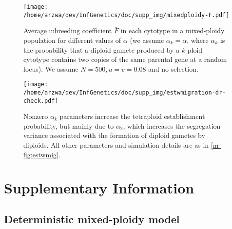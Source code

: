 \documentclass[11pt,a4paper]{article}
\begin{document}
\begin{figure}[H]
\centering
\texttt{[image: /home/arzwa/dev/InfGenetics/doc/supp\_img/mixedploidy-F.pdf]}
\caption{Average inbreeding coefficient \(\bar{F}\) in each cytotype in
a mixed-ploidy population for different values of \(\alpha\) (we assume
\(\alpha_k=\alpha\), where \(\alpha_k\) is the probability that a
diploid gamete produced by a \(k\)-ploid cytotype contains two copies of
the same parental gene at a random locus). We assume \(N=500, u=v=0.08\)
and no selection.}\label{fig:f1}
\end{figure}

\begin{figure}
\texttt{[image: /home/arzwa/dev/InfGenetics/doc/supp\_img/estwmigration-dr-check.pdf]}
\caption{
    Nonzero $\alpha_k$ parameters increase the tetraploid establishment
    probability, but mainly due to $\alpha_2$, which increases the segregation
    variance associated with the formation of diploid gametes by diploids.
    All other parameters and simulation details are as in \cref{m-fig:estwmig}.
\label{fig:suppdr}}
\end{figure}

\clearpage

\section{Supplementary Information}

\subsection{Deterministic mixed-ploidy model \label{sec:det}}
\end{document}
